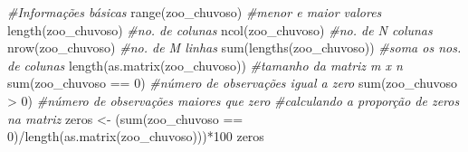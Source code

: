 \documentclass[
  letterpaper,
  DIV=11,
  numbers=noendperiod]{scrartcl}
\newenvironment{Shaded}{}{}
\newcommand{\CommentTok}[1]{\textcolor[rgb]{0.38,0.63,0.69}{\textit{#1}}}
\newcommand{\DecValTok}[1]{\textcolor[rgb]{0.25,0.63,0.44}{#1}}
\newcommand{\FunctionTok}[1]{\textcolor[rgb]{0.02,0.16,0.49}{#1}}
\newcommand{\NormalTok}[1]{#1}
\newcommand{\OtherTok}[1]{\textcolor[rgb]{0.00,0.44,0.13}{#1}}
\newcommand{\SpecialCharTok}[1]{\textcolor[rgb]{0.25,0.44,0.63}{#1}}
\begin{document}
\begin{Shaded}
\begin{Highlighting}[numbers=left,,]
\CommentTok{\#Informações básicas}
\FunctionTok{range}\NormalTok{(zoo\_chuvoso) }\CommentTok{\#menor e maior valores}
\FunctionTok{length}\NormalTok{(zoo\_chuvoso) }\CommentTok{\#no. de colunas}
\FunctionTok{ncol}\NormalTok{(zoo\_chuvoso) }\CommentTok{\#no. de N colunas}
\FunctionTok{nrow}\NormalTok{(zoo\_chuvoso) }\CommentTok{\#no. de M linhas}
\FunctionTok{sum}\NormalTok{(}\FunctionTok{lengths}\NormalTok{(zoo\_chuvoso)) }\CommentTok{\#soma os nos. de colunas}
\FunctionTok{length}\NormalTok{(}\FunctionTok{as.matrix}\NormalTok{(zoo\_chuvoso)) }\CommentTok{\#tamanho da matriz m x n}
\FunctionTok{sum}\NormalTok{(zoo\_chuvoso }\SpecialCharTok{==} \DecValTok{0}\NormalTok{) }\CommentTok{\#número de observações igual a zero}
\FunctionTok{sum}\NormalTok{(zoo\_chuvoso }\SpecialCharTok{\textgreater{}} \DecValTok{0}\NormalTok{) }\CommentTok{\#número de observações maiores que zero}
\CommentTok{\#calculando a proporção de zeros na matriz}
\NormalTok{zeros }\OtherTok{\textless{}{-}}\NormalTok{ (}\FunctionTok{sum}\NormalTok{(zoo\_chuvoso }\SpecialCharTok{==} \DecValTok{0}\NormalTok{)}\SpecialCharTok{/}\FunctionTok{length}\NormalTok{(}\FunctionTok{as.matrix}\NormalTok{(zoo\_chuvoso)))}\SpecialCharTok{*}\DecValTok{100}
\NormalTok{zeros}


\end{Highlighting}
\end{Shaded}
\end{document}
